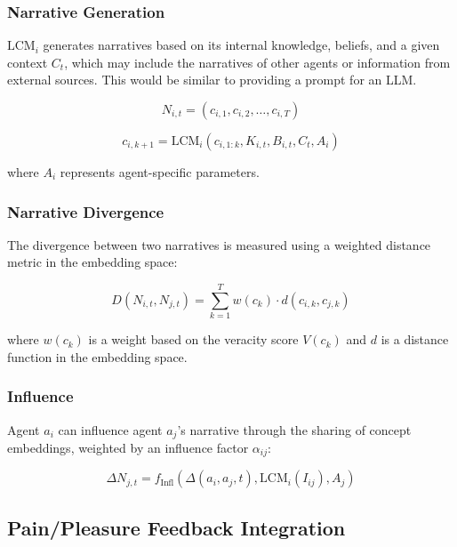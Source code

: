 \documentclass[12pt, a4paper]{article}
\begin{document}
\subsubsection{Narrative Generation}
$\text{LCM}_i$ generates narratives based on its internal knowledge, beliefs, and a given context $C_t$, which may include the narratives of other agents or information from external sources. This would be similar to providing a prompt for an LLM.

\begin{equation}
N_{i,t} = (c_{i,1}, c_{i,2}, \ldots, c_{i,T})
\end{equation}

\begin{equation}
c_{i,k+1} = \text{LCM}_i(c_{i,1:k}, K_{i,t}, B_{i,t}, C_t, A_i)
\end{equation}

where $A_i$ represents agent-specific parameters.


\subsubsection{Narrative Divergence}
The divergence between two narratives is measured using a weighted distance metric in the embedding space:

\begin{equation}
D(N_{i,t}, N_{j,t}) = \sum_{k=1}^T w(c_k) \cdot d(c_{i,k}, c_{j,k})
\end{equation}

where $w(c_k)$ is a weight based on the veracity score $V(c_k)$ and $d$ is a distance function in the embedding space.



\subsubsection{Influence}
Agent $a_i$ can influence agent $a_j$'s narrative through the sharing of concept embeddings, weighted by an influence factor $\alpha_{ij}$:

\begin{equation}
\Delta N_{j,t} = f_{\text{Infl}}(\Delta(a_i, a_j, t), \text{LCM}_i(I_{ij}), A_j)
\end{equation}


 

\subsection{Pain/Pleasure Feedback Integration}
\end{document}
